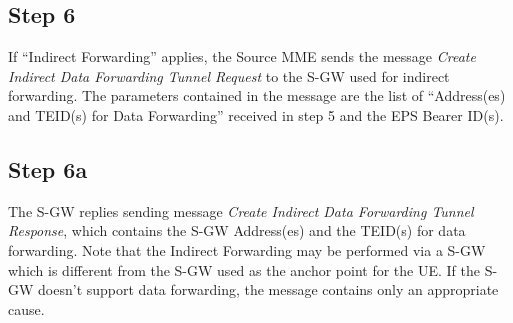 \subsection*{Step 6}
If ``Indirect Forwarding'' applies, the Source MME sends the message \emph{Create
Indirect Data Forwarding Tunnel Request} to the S-GW used for indirect forwarding.
The parameters contained in the message are the list of ``Address(es) and TEID(s) for Data
Forwarding'' received in step 5 and the EPS Bearer ID(s).



\subsection*{Step 6a}
The S-GW replies sending message \emph{Create Indirect Data Forwarding Tunnel
Response}, which contains the S-GW Address(es) and the TEID(s) for data
forwarding. Note that the  Indirect Forwarding may be performed via a S-GW
which is different from the S-GW used as the anchor point for the UE.
If the S-GW doesn't support data forwarding, the message contains only an appropriate
cause.
